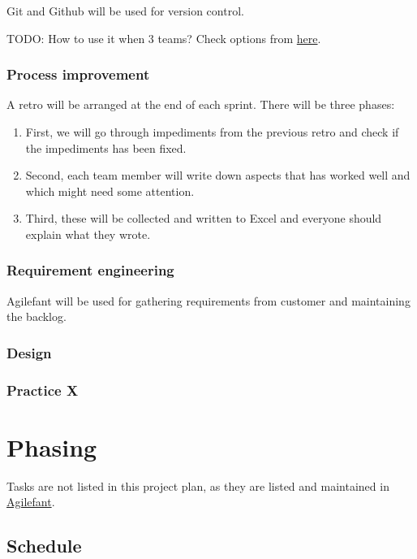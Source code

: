 \documentclass{report}
\begin{document}
Git and Github will be used for version control. 

TODO: How to use it when 3 teams? Check options from \href{https://www.atlassian.com/git/workflows}{here}.

\subsection{Process improvement}

A retro will be arranged at the end of each sprint. There will be three phases:

\begin{enumerate}
\item First, we will go through impediments from the previous retro and check if the impediments has been fixed.
\item Second, each team member will write down aspects that has worked well and which might need some attention.
\item Third, these will be collected and written to Excel and everyone should explain what they wrote.
\end{enumerate}

\subsection{Requirement engineering}

Agilefant will be used for gathering requirements from customer and maintaining the backlog. 

\subsection{Design}

\subsection{Practice X}

\chapter{Phasing}

Tasks are not listed in this project plan, as they are listed and maintained in \href{https://cloud.agilefant.com/dev/}{Agilefant}.

\section{Schedule}
\end{document}
